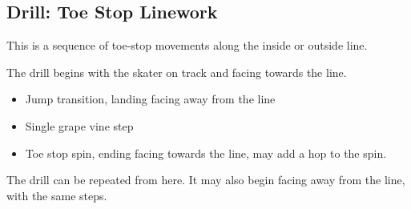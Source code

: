 \subsection*{Drill: Toe Stop Linework}

This is a sequence of toe-stop movements along the inside or outside line.

The drill begins with the skater on track and facing towards the line.

\begin{itemize}
\item Jump transition, landing facing away from the line
\item Single grape vine step 
\item Toe stop spin, ending facing towards the line, may add a hop to the spin.
\end{itemize}

The drill can be repeated from here.
It may also begin facing away from the line, with the same steps.

